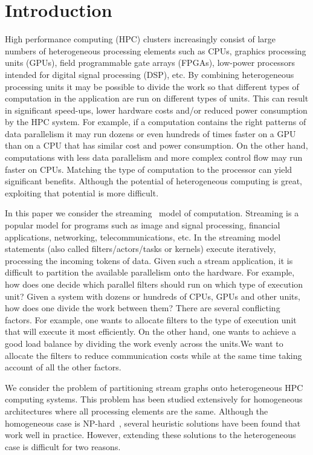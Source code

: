 \section{Introduction}
\label{sec:introduction}

High performance computing (HPC) clusters increasingly consist of large numbers
of heterogeneous processing elements such as CPUs, graphics processing units
(GPUs), field programmable gate arrays (FPGAs), low-power processors intended
for digital signal processing (DSP), etc. By combining heterogeneous
processing units it may be possible to divide the work so that different
types of computation in the application are run on different types of
units. This can result in significant speed-ups, lower hardware costs
and/or reduced power consumption by the HPC system.  For example, if a
computation contains the right patterns of data parallelism it may run
dozens or even hundreds of times faster on a GPU than on a CPU that has
similar cost and power consumption. On the other hand, computations with
less data parallelism and more complex control flow may run faster on
CPUs. Matching the type of computation to the processor can yield
significant benefits. Although the potential of heterogeneous computing is
great, exploiting that potential is more difficult.


\vspace{1cm}


In this paper we consider the streaming~\cite{jbuck94} model of
computation. Streaming is a popular model for programs such as image and
signal processing, financial applications, networking,
telecommunications, etc. In the streaming model statements (also called
filters/actors/tasks or kernels) execute iteratively, processing the incoming
tokens of data. Given such a stream application, it is
difficult to partition the available parallelism onto the hardware. For
example, how does one decide which parallel filters should run on which
type of execution unit? Given a system with dozens or hundreds of CPUs,
GPUs and other units, how does one divide the work between them?  There
are several conflicting factors. For example, one wants to allocate
filters to the type of execution unit that will execute it most
efficiently. On the other hand, one wants to achieve a good load balance
by dividing the work evenly across the units.We want to allocate the filters to
reduce communication costs while at the same time taking account of all the
other factors.

We consider the problem of partitioning stream graphs onto
heterogeneous HPC computing systems. This problem has been
studied extensively for homogeneous architectures where all processing
elements are the same. Although the homogeneous case is
NP-hard~\cite{vsar89}, several heuristic solutions have been found that
work well in practice. However, extending these solutions to the
heterogeneous case is difficult for two reasons.

